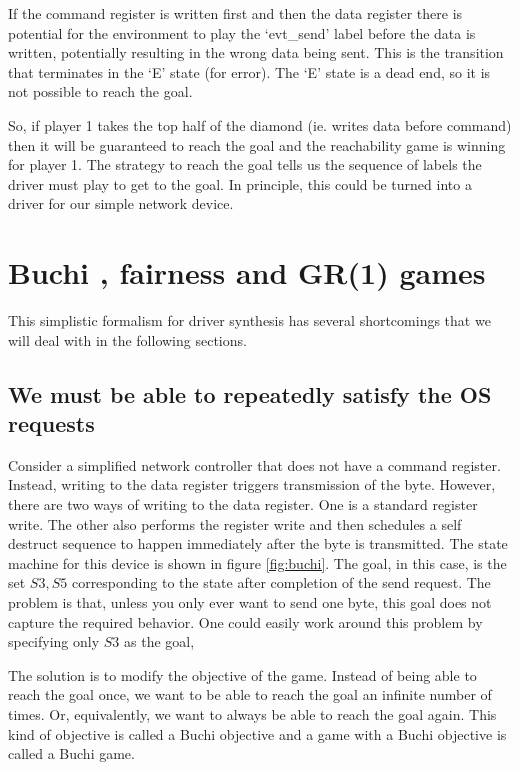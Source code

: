\documentclass[a4paper,twoside,openright,11pt]{book}
\newcommand{\buchi}{Buchi }
\theoremstyle{definition}
\begin{document}
If the command register is written first and then the data register there is potential for the environment to play the `evt\_send' label before the data is written, potentially resulting in the wrong data being sent. This is the transition that terminates in the `E' state (for error). The `E' state is a dead end, so it is not possible to reach the goal. 

So, if player 1 takes the top half of the diamond (ie. writes data before command) then it will be guaranteed to reach the goal and the reachability game is winning for player 1. The strategy to reach the goal tells us the sequence of labels the driver must play to get to the goal. In principle, this could be turned into a driver for our simple network device.

\section{\buchi, fairness and GR(1) games}

This simplistic formalism for driver synthesis has several shortcomings that we will deal with in the following sections.

\subsection{We must be able to repeatedly satisfy the OS requests}

Consider a simplified network controller that does not have a command register. Instead, writing to the data register triggers transmission of the byte. However, there are two ways of writing to the data register. One is a standard register write. The other also performs the register write and then schedules a self destruct sequence to happen immediately after the byte is transmitted. The state machine for this device is shown in figure \ref{fig:buchi}. The goal, in this case, is the set ${S3, S5}$ corresponding to the state after completion of the send request. The problem is that, unless you only ever want to send one byte, this goal does not capture the required behavior. One could easily work around this problem by specifying only ${S3}$ as the goal, 

The solution is to modify the objective of the game. Instead of being able to reach the goal once, we want to be able to reach the goal an infinite number of times. Or, equivalently, we want to always be able to reach the goal again. This kind of objective is called a Buchi objective and a game with a Buchi objective is called a Buchi game. 
\end{document}
